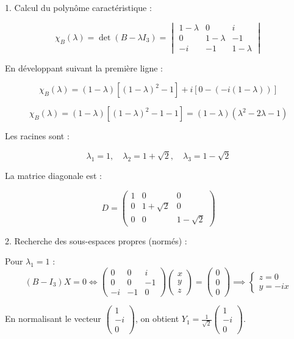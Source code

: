 \documentclass[french]{yLectureNote}
\begin{document}
1. Calcul du polynôme caractéristique :

$$\chi_B(\lambda) = \det(B - \lambda I_3) = \begin{vmatrix} 1-\lambda & 0 & i \\ 0 & 1-\lambda & -1 \\ -i & -1 & 1-\lambda \end{vmatrix}$$



En développant suivant la première ligne :

$$\chi_B(\lambda) = (1-\lambda) \left[ (1-\lambda)^2 - 1 \right] + i \left[ 0 - (-i(1-\lambda)) \right]$$


$$\chi_B(\lambda) = (1-\lambda) [ (1-\lambda)^2 - 1 - 1 ] = (1-\lambda)(\lambda^2 - 2\lambda - 1)$$



Les racines sont :

$$\lambda_1 = 1, \quad \lambda_2 = 1 + \sqrt{2}, \quad \lambda_3 = 1 - \sqrt{2}$$


La matrice diagonale est :

$$D = \begin{pmatrix} 1 & 0 & 0 \\ 0 & 1+\sqrt{2} & 0 \\ 0 & 0 & 1-\sqrt{2} \end{pmatrix}$$


2. Recherche des sous-espaces propres (normés) :

Pour $\lambda_1 = 1$ : 
$$(B - I_3)X = 0 \iff \begin{pmatrix} 0 & 0 & i \\ 0 & 0 & -1 \\ -i & -1 & 0 \end{pmatrix}\begin{pmatrix} x \\ y \\ z \end{pmatrix} = \begin{pmatrix} 0 \\ 0 \\ 0 \end{pmatrix} \implies \begin{cases} z = 0 \\ y = -ix \end{cases}$$



En normalisant le vecteur $\begin{pmatrix} 1 \\ -i \\ 0 \end{pmatrix}$, on obtient $Y_1 = \frac{1}{\sqrt{2}}\begin{pmatrix} 1 \\ -i \\ 0 \end{pmatrix}$.
\end{document}
